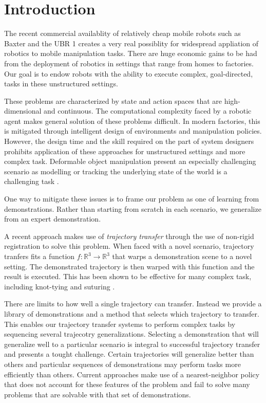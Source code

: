 \section{Introduction}
The recent commercial availablity of relatively cheap mobile robots such as Baxter and the UBR 1 
creates a very real possiblity for widespread appliation of robotics to mobile manipulation tasks.
There are huge economic gains to be had from the deployment of robotics in settings that range from homes to factories.
Our goal is to endow robots with the ability to execute complex, goal-directed, tasks in these unstructured settings.

These problems are characterized by state and action spaces that are high-dimensional and continuous.
The computational complexity faced by a robotic agent makes general solution of these problems difficult.
In modern factories, this is mitigated through intelligent design of environments and manipulation policies.
However, the design time and the skill required on the part of system designers prohibits application of these approaches for unstructured settings and more complex task.
Deformable object manipulation present an especially challenging scenario as modelling or tracking the underlying state of the world is a challenging task \cite{SchulmanLeeHoAbbeel_ICRA2013,Javdanietal_2011,Haehnel03a}.

One way to mitigate these issues is to frame our problem as one of learning from demonstrations.
Rather than starting from scratch in each scenario, we generalize from an expert demonstration.

A recent approach makes use of \emph{trajectory transfer} through the use of non-rigid registration to solve this problem.
When faced with a novel scenario, trajectory tranfers fits a function $f:\mathbb{R}^3 \rightarrow \mathbb{R}^3$ that warps a demonstration scene to a novel setting.
The demonstrated trajectory is then warped with this function and the result is executed. 
This has been shown to be effective for many complex task, including knot-tying and suturing \cite{Schulmanetal_ISRR2013, Schulmanetal_IROS2013}.

There are limits to how well a single trajectory can transfer. 
Instead we provide a library of demonstrations and a method that selects which trajectory to transfer.
This enables our trajectory transfer systems to perform complex tasks by sequencing several trajecotry generalizations.
Selecting a demonstration that will generalize well to a particular scenario is integral to successful trajectory transfer and presents a tought challenge. 
Certain trajectories will generalize better than others and particular sequences of demonstrations may perform tasks more efficiently than others.
Current approaches make use of a nearest-neighbor policy that does not account for these features of the problem and fail to solve many problems that are solvable with that set of demonstrations.

